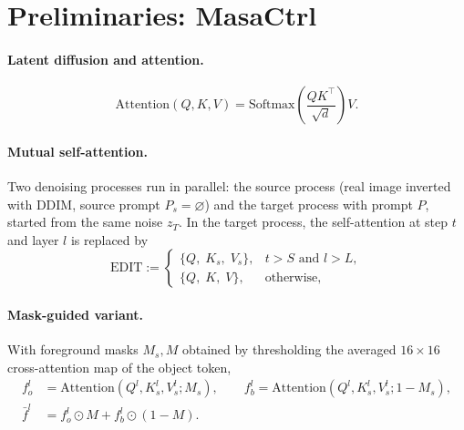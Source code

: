 \section{Preliminaries: MasaCtrl}
\label{sec:background}

\paragraph{Latent diffusion and attention.}
\begin{equation}
\mathrm{Attention}(Q,K,V)=\mathrm{Softmax}\!\left(\frac{QK^{\top}}{\sqrt{d}}\right)V .
\label{eq:attn}
\end{equation}

\paragraph{Mutual self-attention.}
Two denoising processes run in parallel: the source process (real image inverted with DDIM, source prompt
$P_s=\varnothing$) and the target process with prompt $P$, started from the same noise $z_T$.
In the target process, the self-attention at step $t$ and layer $l$ is replaced by
\begin{equation}
\mathrm{EDIT}:=
\begin{cases}
\{Q,\;K_s,\;V_s\}, & t>S \text{ and } l>L,\\
\{Q,\;K,\;V\}, & \text{otherwise},
\end{cases}
\label{eq:masactrl}
\end{equation}

\paragraph{Mask-guided variant.}
With foreground masks $M_s, M$ obtained by thresholding the averaged $16\times16$ cross-attention map of the object token,
\begin{align}
f_o^l &= \mathrm{Attention}(Q^l, K_s^l, V_s^l; M_s), \qquad
f_b^l = \mathrm{Attention}(Q^l, K_s^l, V_s^l; 1-M_s),\\
\bar f^l &= f_o^l \odot M + f_b^l \odot (1-M).
\end{align}
